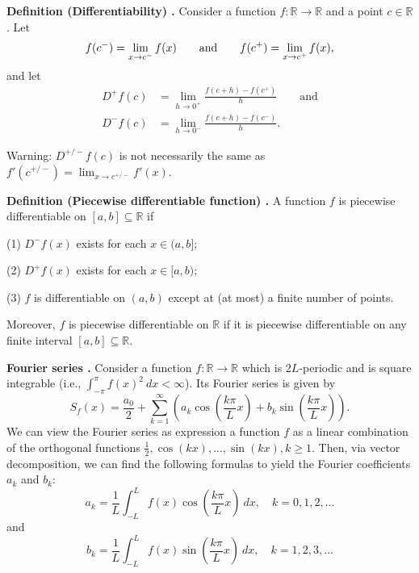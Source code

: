 \begin{shaded}
\textbf{Definition (Differentiability) \cite{math2111_notes}.} Consider a function $ f : \mathbb{R} \to \mathbb{R} $ and a point $c \in \mathbb{R}$. Let
$$ f(c^-) = \lim_{x \to c^-} f(x) \qquad \textnormal{and} \qquad f(c^+) = \lim_{x \to c^+} f(x) , $$
and let
\begin{align*}
	D^+ f(c) &= \lim_{h \to 0^+} \frac{f(c + h) - f(c^+)}{h} \qquad \text{and} \\
	D^- f(c) &= \lim_{h \to 0^-} \frac{f(c + h) - f(c^-)}{h} .
\end{align*}

Warning: $D^{+/-} f(c)$ is not necessarily the same as $f'(c^{+/-}) = \lim_{x \to c^{+/-}} f'(x)$.
\end{shaded}

\begin{shaded}
\textbf{Definition (Piecewise differentiable function) \cite{math2111_notes}.} A function $f$ is piecewise differentiable on $[a, b] \subseteq \mathbb{R}$ if

(1) $D^- f(x)$ exists for each $x \in (a, b]$;

(2) $D^+ f(x)$ exists for each $x \in [a, b)$;

(3) $f$ is differentiable on $(a, b)$ except at (at most) a finite number of points.

Moreover, $f$ is piecewise differentiable on $\mathbb{R}$ if it is piecewise differentiable on any finite interval $[a, b] \subseteq \mathbb{R}$.
\end{shaded}

\begin{shaded}
\textbf{Fourier series \cite{math2111_notes}.} Consider a function $f : \mathbb{R} \to \mathbb{R}$ which is $2 L$-periodic and is square integrable (i.e., $\int_{-\pi}^\pi f(x)^2 \ dx < \infty $). Its Fourier series is given by
$$ S_f(x) = \frac{a_0}{2} + \sum_{k = 1}^{\infty} \left( a_k \cos \left( \frac{k \pi}{L}x \right) + b_k \sin \left( \frac{k \pi}{L}x \right) \right) . $$
We can view the Fourier series as expression a function $f$ as a linear combination of the orthogonal functions $\frac{1}{2}, \cos(kx), ..., \sin(kx), k \geq 1$. Then, via vector decomposition, we can find the following formulas to yield the Fourier coefficients $a_k$ and $b_k$:
$$ a _k = \frac{1}{L} \int_{-L}^L f(x) \cos \left( \frac{k \pi}{L}x \right) \ dx, \quad k = 0, 1, 2, ... $$
and
$$ b _k = \frac{1}{L} \int_{-L}^L f(x) \sin \left( \frac{k \pi}{L}x \right) \ dx, \quad k = 1, 2, 3, ... $$
\end{shaded}

